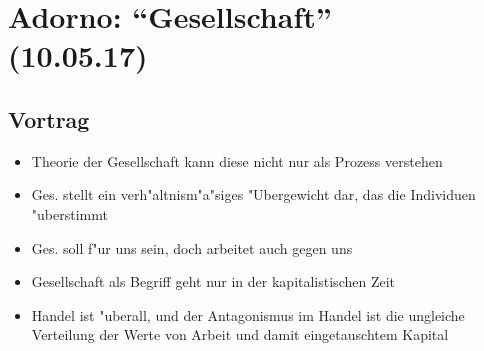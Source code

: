 \documentclass[emulatestandardclasses]{scrartcl}
\begin{document}
\section{Adorno: "`Gesellschaft"'
\\(10.05.17)}

\subsection{Vortrag}

\begin{itemize}
  \item Theorie der Gesellschaft kann diese nicht nur als Prozess verstehen
  \item Ges. stellt ein verh"altnism"a"siges "Ubergewicht dar, das die Individuen "uberstimmt
  \item Ges. soll f"ur uns sein, doch arbeitet auch gegen uns
  \item Gesellschaft als Begriff geht nur in der kapitalistischen Zeit
  \item Handel ist "uberall, und der Antagonismus im Handel ist die ungleiche Verteilung der Werte von Arbeit und damit eingetauschtem Kapital
\end{itemize}










\newpage


\end{document}
